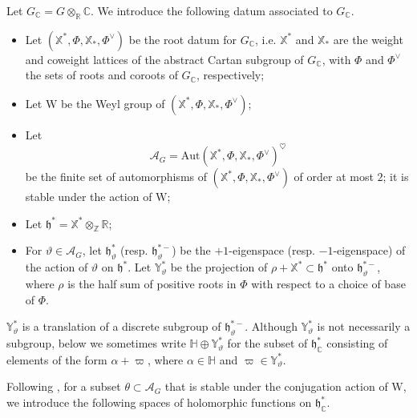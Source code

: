 \documentclass[iccmp]{ipbook}
\newcommand{\BC}{{\mathbb {C}}}
\newcommand{\BH}{{\mathbb {H}}}
\newcommand{\BR}{{\mathbb {R}}}
\newcommand{\BX}{{\mathbb {X}}}
\newcommand{\BY}{{\mathbb {Y}}}
\newcommand{\BZ}{{\mathbb {Z}}}
\newcommand{\Fh}{{\mathfrak {h}}}
\newcommand{\RW}{{\mathrm {W}}}
\newcommand{\Aut}{{\mathrm{Aut}}}
\def\alp{{\alpha}}
\def\vpi{\varpi}
\def\heart{\heartsuit}
\begin{document}
Let $G_\BC = G\otimes_\BR\BC$. We introduce the following datum associated to $G_\BC$.


\begin{itemize}
\item Let $(\BX^*,\Phi,\BX_*,\Phi^\vee)$ be the root datum for $G_\BC$, i.e. $\BX^*$ and $\BX_*$ are the weight and coweight lattices of the abstract Cartan subgroup of $G_\BC$, with $\Phi$ and $\Phi^\vee$ the sets of roots and coroots of $G_\BC$, respectively;

\item Let $\RW$ be the Weyl group of $(\BX^*,\Phi,\BX_*,\Phi^\vee)$;

\item Let
\[
\mathscr A_G=\Aut(\BX^*,\Phi,\BX_*,\Phi^\vee)^\heart
\]
be the finite set of automorphisms of $(\BX^*,\Phi,\BX_*,\Phi^\vee)$ of order at most $2$; it is stable under the action of $\RW$;

\item Let $\Fh^* = \BX^*\otimes_\BZ \BR$;

\item For $\vartheta\in \mathscr A_G$, let $\Fh^*_\vartheta$ (resp. $\Fh^{*-}_\vartheta$) be the $+1$-eigenspace (resp. $-1$-eigenspace) of the action of $\vartheta$ on $\Fh^*$. Let $\BY^*_\vartheta$ be the projection of $\rho+\BX^*\subset \Fh^*$ onto $\Fh^{*-}_\vartheta$, where $\rho$ is the half sum of positive roots in $\Phi$ with respect to a choice of base of $\Phi$.
\end{itemize}
$\BY^*_\vartheta$ is a translation of a discrete subgroup of $\Fh^{*-}_\vartheta$. Although $\BY^*_\vartheta$ is not necessarily a subgroup, below we sometimes write $\BH\oplus \BY^*_\vartheta$ for the subset of $\Fh^*_\BC$ consisting of elements of the form $\alp+\vpi$, where $\alp\in \BH$ and $\vpi\in \BY^*_\vartheta$.

Following \cite[\S 2]{MR4298750}, for a subset $\theta\subset \mathscr A_G$ that is stable under the conjugation action of $\RW$, we introduce the following spaces of holomorphic functions on $\Fh^*_\BC$.
\end{document}
